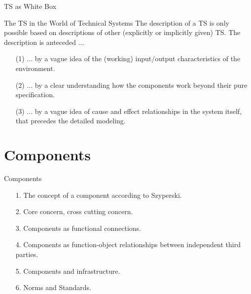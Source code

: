 \documentclass{beamer}
\begin{document}
\begin{frame}{TS as White Box}
  \begin{block}{The TS in the World of Technical Systems}
    The description of a TS is only possible based on descriptions of other
    (explicitly or implicitly given) TS. The description is anteceded ...
    \begin{itemize}
    \item[(1)] ... by a vague idea of the (working) input/output
      characteristics of the environment.
    \item [(2)] ... by a clear understanding how the components work beyond
      their pure specification.
    \item [(3)] ... by a vague idea of cause and effect relationships in the
      system itself, that precedes the detailed modeling.
    \end{itemize}
  \end{block}
\end{frame}
\section{Components}
\begin{frame}{Components}
  \begin{itemize}
  \item [1.] The concept of a component according to Szyperski.
  \item [2.] Core concern, cross cutting concern.
  \item [3.] Components as functional connections.
  \item [4.] Components as function-object relationships between independent
    third parties.
  \item [5.] Components and infrastructure.
  \item [6.] Norms and Standards.
  \end{itemize}
\end{frame}
\end{document}
